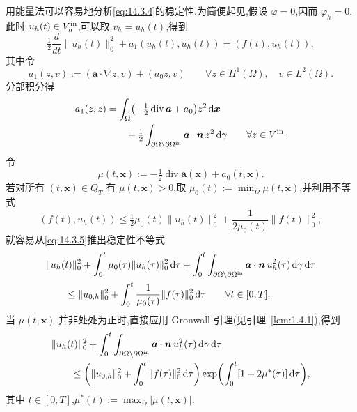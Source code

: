 用能量法可以容易地分析\eqref{eq:14.3.4}的稳定性.为简便起见,假设 \(\varphi=0\),因而 \(\varphi_h=0\).此时 \(u_h(t)\in V_h^{\rm in}\),可以取 \(v_h=u_h(t)\),得到
\begin{equation}\label{eq:14.3.5}
  \tfrac12\frac{d}{dt}\|u_h(t)\|_0^2+a_1(u_h(t),u_h(t))=(f(t),u_h(t)),
\end{equation}
其中令
\begin{equation}\label{eq:14.3.6}
  a_1(z,v):=(\boldsymbol{a}\cdot\nabla z,v)+(a_0z,v)
    \qquad\forall z\in H^1(\Omega),\quad v\in L^2(\Omega).
\end{equation}
分部积分得
\begin{equation}\label{eq:14.3.7}
  \begin{aligned}
    a_1(z,z)&=\int_\Omega\bigl(-\tfrac12\operatorname{div}\boldsymbol{a}+a_0\bigr)z^2\,\mathrm d\boldsymbol{x}\\
            &\qquad+\tfrac12\int_{\partial\Omega\setminus\partial\Omega^{\rm in}}
                      \boldsymbol{a}\cdot\boldsymbol{n}\,z^2\,\mathrm d\gamma
                 \qquad\forall z\in V^{\rm in}.
  \end{aligned}
\end{equation}
令
\begin{equation}\label{eq:14.3.8}
  \mu(t,\boldsymbol{x}):=-\tfrac12\operatorname{div}\boldsymbol{a}(\boldsymbol{x})+a_0(t,\boldsymbol{x}).
\end{equation}
若对所有 \((t,\boldsymbol{x})\in\overline Q_T\) 有 \(\mu(t,\boldsymbol{x})>0\),取 \(\mu_0(t):=\min_{\overline\Omega}\mu(t,\boldsymbol{x})\),并利用不等式
\[
  (f(t),u_h(t))\le\tfrac12\mu_0(t)\|u_h(t)\|_0^2
                  +\frac{1}{2\mu_0(t)}\|f(t)\|_0^2,
\]
就容易从\eqref{eq:14.3.5}推出稳定性不等式
\begin{equation}\label{eq:14.3.9}
  \begin{aligned}
    &\|u_h(t)\|_0^2+\int_0^t\mu_0(\tau)\|u_h(\tau)\|_0^2\,\mathrm d\tau
      +\int_0^t\int_{\partial\Omega\setminus\partial\Omega^{\rm in}}
         \boldsymbol{a}\cdot\boldsymbol{n}\,u_h^2(\tau)\,\mathrm d\gamma\,\mathrm d\tau\\
    &\qquad\le\|u_{0,h}\|_0^2+\int_0^t\frac1{\mu_0(\tau)}\|f(\tau)\|_0^2\,\mathrm d\tau
      \qquad\forall t\in[0,T].
  \end{aligned}
\end{equation}
当 \(\mu(t,\boldsymbol{x})\) 并非处处为正时,直接应用 Gronwall 引理(见引理~\ref{lem:1.4.1}),得到
\begin{equation}\label{eq:14.3.10}
  \begin{aligned}
    &\|u_h(t)\|_0^2+\int_0^t\int_{\partial\Omega\setminus\partial\Omega^{\rm in}}
         \boldsymbol{a}\cdot\boldsymbol{n}\,u_h^2(\tau)\,\mathrm d\gamma\,\mathrm d\tau\\
    &\qquad\le\biggl(\|u_{0,h}\|_0^2+\int_0^t\|f(\tau)\|_0^2\,\mathrm d\tau\biggr)
        \exp\biggl(\int_0^t[1+2\mu^*(\tau)]\,\mathrm d\tau\biggr),
  \end{aligned}
\end{equation}
其中 \(t\in[0,T]\),\(\mu^*(t):=\max_{\overline\Omega}|\mu(t,\boldsymbol{x})|\).

